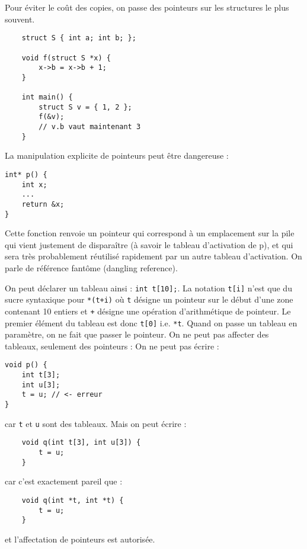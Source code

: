 \documentclass{cours}
\begin{document}
Pour éviter le coût des copies, on passe des pointeurs sur les structures le plus souvent.
\begin{verbatim}
    struct S { int a; int b; };

    void f(struct S *x) {
        x->b = x->b + 1;
    }

    int main() {
        struct S v = { 1, 2 };
        f(&v);
        // v.b vaut maintenant 3
    }
\end{verbatim}

La manipulation explicite de pointeurs peut être dangereuse : 
\begin{verbatim}
int* p() {
    int x;
    ...
    return &x;
}
\end{verbatim}

Cette fonction renvoie un pointeur qui correspond à un emplacement sur la pile qui vient justement de disparaître (à savoir le tableau d'activation de p), et qui sera très probablement réutilisé rapidement par un autre tableau d'activation.
On parle de référence fantôme (dangling reference).

On peut déclarer un tableau ainsi : \texttt{int t[10];}. La notation \texttt{t[i]} n'est que du sucre syntaxique pour \texttt{*(t+i)} où \texttt{t} désigne un pointeur sur le début d'une zone contenant 10 entiers et \texttt{+} désigne une opération d'arithmétique de pointeur. Le premier élément du tableau est donc \texttt{t[0]} i.e. \texttt{*t}. Quand on passe un tableau en paramètre, on ne fait que passer le pointeur. On ne peut pas affecter des tableaux, seulement des pointeurs : 
On ne peut pas écrire : 
\begin{verbatim}
void p() {
    int t[3];
    int u[3];
    t = u; // <- erreur
}
\end{verbatim}
car \texttt{t} et \texttt{u} sont des tableaux.
Mais on peut écrire :
\begin{verbatim}
    void q(int t[3], int u[3]) {
        t = u;
    }
\end{verbatim}
car c'est exactement pareil que : 
\begin{verbatim}
    void q(int *t, int *t) {
        t = u;
    }
\end{verbatim}
et l'affectation de pointeurs est autorisée.
\end{document}
